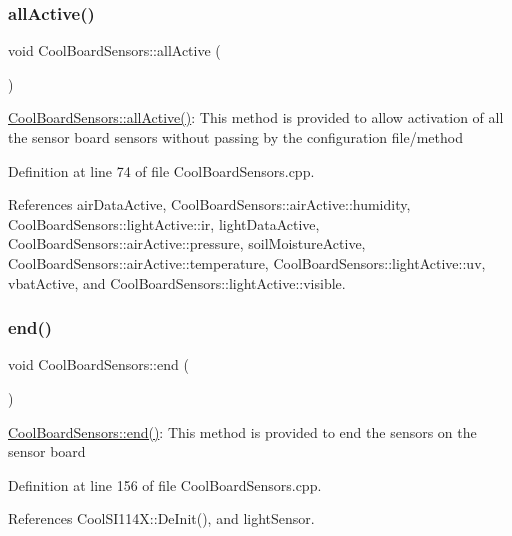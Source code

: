 \subsubsection{\texorpdfstring{all\+Active()}{allActive()}}
{\footnotesize\ttfamily void Cool\+Board\+Sensors\+::all\+Active (\begin{DoxyParamCaption}{ }\end{DoxyParamCaption})}

\hyperlink{class_cool_board_sensors_aa432c5aac88f89c31a10766390f23e0b}{Cool\+Board\+Sensors\+::all\+Active()}\+: This method is provided to allow activation of all the sensor board sensors without passing by the configuration file/method 

Definition at line 74 of file Cool\+Board\+Sensors.\+cpp.



References air\+Data\+Active, Cool\+Board\+Sensors\+::air\+Active\+::humidity, Cool\+Board\+Sensors\+::light\+Active\+::ir, light\+Data\+Active, Cool\+Board\+Sensors\+::air\+Active\+::pressure, soil\+Moisture\+Active, Cool\+Board\+Sensors\+::air\+Active\+::temperature, Cool\+Board\+Sensors\+::light\+Active\+::uv, vbat\+Active, and Cool\+Board\+Sensors\+::light\+Active\+::visible.

\mbox{\label{class_cool_board_sensors_a4902b69f6e628bd6557193758fdd2bae}} 
\subsubsection{\texorpdfstring{end()}{end()}}
{\footnotesize\ttfamily void Cool\+Board\+Sensors\+::end (\begin{DoxyParamCaption}{ }\end{DoxyParamCaption})}

\hyperlink{class_cool_board_sensors_a4902b69f6e628bd6557193758fdd2bae}{Cool\+Board\+Sensors\+::end()}\+: This method is provided to end the sensors on the sensor board 

Definition at line 156 of file Cool\+Board\+Sensors.\+cpp.



References Cool\+S\+I114\+X\+::\+De\+Init(), and light\+Sensor.

